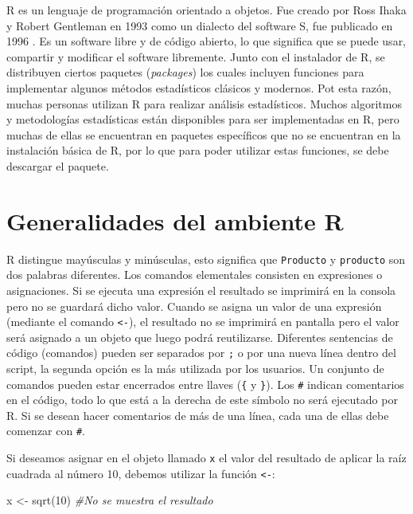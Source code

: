 \documentclass[
]{book}
\newenvironment{Shaded}{\begin{snugshade}}{\end{snugshade}}
\newcommand{\CommentTok}[1]{\textcolor[rgb]{0.56,0.35,0.01}{\textit{#1}}}
\newcommand{\DecValTok}[1]{\textcolor[rgb]{0.00,0.00,0.81}{#1}}
\newcommand{\FunctionTok}[1]{\textcolor[rgb]{0.00,0.00,0.00}{#1}}
\newcommand{\NormalTok}[1]{#1}
\newcommand{\OtherTok}[1]{\textcolor[rgb]{0.56,0.35,0.01}{#1}}
\begin{document}
R \citep{R-base} es un lenguaje de programación orientado a objetos. Fue creado por
Ross Ihaka y Robert Gentleman en 1993 como un dialecto del software S, fue
publicado en 1996 \citep{ihaka1996r}. Es un software libre y de código abierto,
lo que significa que se puede usar, compartir y modificar el software libremente.
Junto con el instalador de R, se distribuyen ciertos paquetes (\emph{packages}) los
cuales incluyen funciones para implementar algunos métodos estadísticos
clásicos y modernos. Pot esta razón, muchas personas utilizan R para realizar análisis
estadísticos. Muchos algoritmos y metodologías estadísticas están disponibles
para ser implementadas en R, pero muchas de ellas se encuentran en paquetes
específicos que no se encuentran en la instalación básica de R, por lo que para
poder utilizar estas funciones, se debe descargar el paquete.

\hypertarget{SintaxisBasica}{%
\section{Generalidades del ambiente R}\label{SintaxisBasica}}

R distingue mayúsculas y minúsculas, esto significa que \texttt{Producto} y \texttt{producto}
son dos palabras diferentes. Los comandos elementales consisten en expresiones
o asignaciones. Si se ejecuta una expresión el resultado se imprimirá en la
consola pero no se guardará dicho valor. Cuando se asigna un valor de una
expresión (mediante el comando \texttt{\textless{}-}), el resultado no se imprimirá en pantalla
pero el valor será asignado a un objeto que luego podrá reutilizarse.
Diferentes sentencias de código (comandos) pueden ser separados por \texttt{;} o por
una nueva línea dentro del script, la segunda opción es la más utilizada por los
usuarios. Un conjunto de comandos pueden estar encerrados entre llaves (\texttt{\{}
y \texttt{\}}). Los \texttt{\#} indican comentarios en el código, todo lo que está a la
derecha de este símbolo no será ejecutado por R. Si se desean hacer comentarios
de más de una línea, cada una de ellas debe comenzar con \texttt{\#}.

Si deseamos asignar en el objeto llamado \texttt{x} el valor del resultado de aplicar
la raíz cuadrada al número 10, debemos utilizar la función \texttt{\textless{}-}:

\begin{Shaded}
\begin{Highlighting}[]
\NormalTok{x }\OtherTok{\textless{}{-}} \FunctionTok{sqrt}\NormalTok{(}\DecValTok{10}\NormalTok{) }\CommentTok{\#No se muestra el resultado}
\end{Highlighting}
\end{Shaded}
\end{document}
